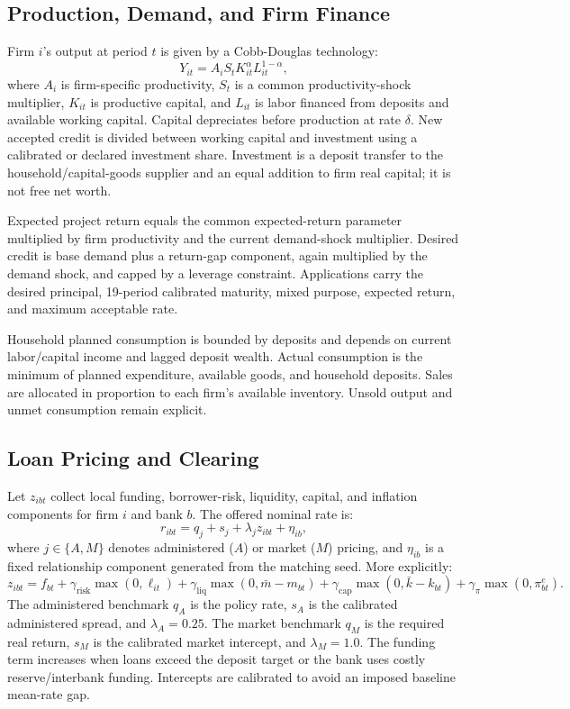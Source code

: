\documentclass[11pt,a4paper]{article}
\begin{document}
\subsection{Production, Demand, and Firm Finance}

Firm $i$'s output at period $t$ is given by a Cobb-Douglas technology:
\begin{equation}
Y_{it} = A_i S_t K_{it}^{\alpha} L_{it}^{1-\alpha},
\end{equation}
where $A_i$ is firm-specific productivity, $S_t$ is a common productivity-shock multiplier, $K_{it}$ is productive capital, and $L_{it}$ is labor financed from deposits and available working capital. Capital depreciates before production at rate $\delta$. New accepted credit is divided between working capital and investment using a calibrated or declared investment share. Investment is a deposit transfer to the household/capital-goods supplier and an equal addition to firm real capital; it is not free net worth.

Expected project return equals the common expected-return parameter multiplied by firm productivity and the current demand-shock multiplier. Desired credit is base demand plus a return-gap component, again multiplied by the demand shock, and capped by a leverage constraint. Applications carry the desired principal, 19-period calibrated maturity, mixed purpose, expected return, and maximum acceptable rate.

Household planned consumption is bounded by deposits and depends on current labor/capital income and lagged deposit wealth. Actual consumption is the minimum of planned expenditure, available goods, and household deposits. Sales are allocated in proportion to each firm's available inventory. Unsold output and unmet consumption remain explicit.

\subsection{Loan Pricing and Clearing}

Let $z_{ibt}$ collect local funding, borrower-risk, liquidity, capital, and inflation components for firm $i$ and bank $b$. The offered nominal rate is:
\begin{equation}
r_{ibt} = q_j + s_j + \lambda_j z_{ibt} + \eta_{ib},
\end{equation}
where $j \in \{A, M\}$ denotes administered ($A$) or market ($M$) pricing, and $\eta_{ib}$ is a fixed relationship component generated from the matching seed. More explicitly:
\begin{equation}
z_{ibt} = f_{bt} + \gamma_{\text{risk}}\max(0, \ell_{it}) + \gamma_{\text{liq}}\max(0, \bar{m} - m_{bt}) + \gamma_{\text{cap}}\max(0, \bar{k} - k_{bt}) + \gamma_{\pi}\max(0, \pi^e_{bt}).
\end{equation}
The administered benchmark $q_A$ is the policy rate, $s_A$ is the calibrated administered spread, and $\lambda_A = 0.25$. The market benchmark $q_M$ is the required real return, $s_M$ is the calibrated market intercept, and $\lambda_M = 1.0$. The funding term increases when loans exceed the deposit target or the bank uses costly reserve/interbank funding. Intercepts are calibrated to avoid an imposed baseline mean-rate gap.
\end{document}
